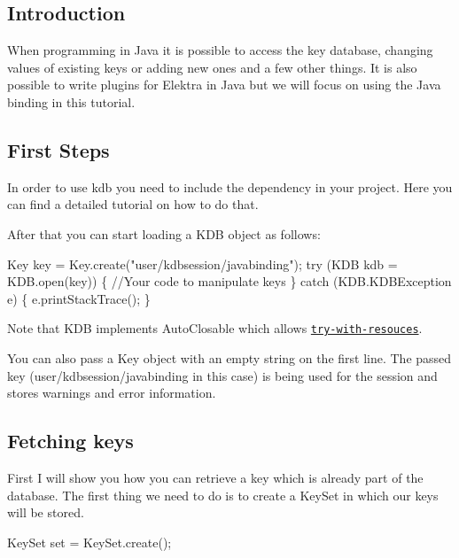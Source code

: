\subsection*{Introduction}

When programming in Java it is possible to access the key database, changing values of existing keys or adding new ones and a few other things. It is also possible to write plugins for Elektra in Java but we will focus on using the Java binding in this tutorial.

\subsection*{First Steps}

In order to use {\ttfamily kdb} you need to include the dependency in your project. Here you can find a detailed tutorial on how to do that.

After that you can start loading a {\ttfamily K\+DB} object as follows\+:


\begin{DoxyCode}
Key key = Key.create(\textcolor{stringliteral}{"user/kdbsession/javabinding"});
\textcolor{keywordflow}{try} (KDB kdb = KDB.open(key)) \{
    \textcolor{comment}{//Your code to manipulate keys}
\} \textcolor{keywordflow}{catch} (KDB.KDBException e) \{
    e.printStackTrace();
\}
\end{DoxyCode}


Note that {\ttfamily K\+DB} implements {\ttfamily Auto\+Closable} which allows \href{https://docs.oracle.com/javase/tutorial/essential/exceptions/tryResourceClose.html}{\tt try-\/with-\/resouces}.

You can also pass a {\ttfamily Key} object with an empty string on the first line. The passed key ({\ttfamily user/kdbsession/javabinding} in this case) is being used for the session and stores warnings and error information.

\subsection*{Fetching keys}

First I will show you how you can retrieve a key which is already part of the database. The first thing we need to do is to create a {\ttfamily Key\+Set} in which our keys will be stored.


\begin{DoxyCode}
KeySet \textcolor{keyword}{set} = KeySet.create();
\end{DoxyCode}



